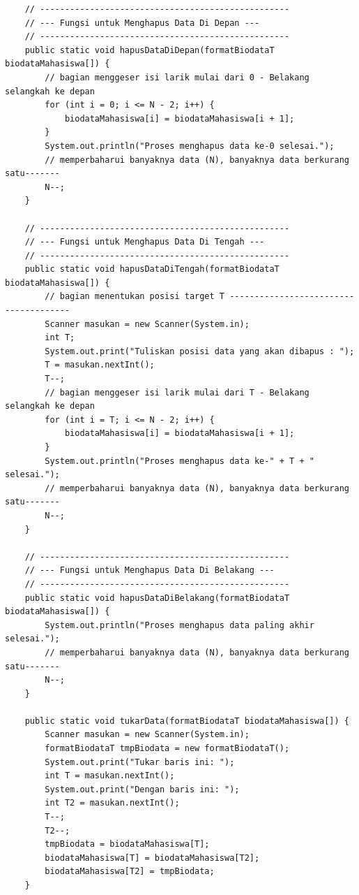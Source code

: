\documentclass[a4paper,12pt]{article}
\begin{document}
\begin{lstlisting}
    // --------------------------------------------------
    // --- Fungsi untuk Menghapus Data Di Depan ---
    // --------------------------------------------------
    public static void hapusDataDiDepan(formatBiodataT biodataMahasiswa[]) {
        // bagian menggeser isi larik mulai dari 0 - Belakang selangkah ke depan
        for (int i = 0; i <= N - 2; i++) {
            biodataMahasiswa[i] = biodataMahasiswa[i + 1];
        }
        System.out.println("Proses menghapus data ke-0 selesai.");
        // memperbaharui banyaknya data (N), banyaknya data berkurang satu-------
        N--;
    }

    // --------------------------------------------------
    // --- Fungsi untuk Menghapus Data Di Tengah ---
    // --------------------------------------------------
    public static void hapusDataDiTengah(formatBiodataT biodataMahasiswa[]) {
        // bagian menentukan posisi target T --------------------------------------
        Scanner masukan = new Scanner(System.in);
        int T;
        System.out.print("Tuliskan posisi data yang akan dibapus : ");
        T = masukan.nextInt();
        T--;
        // bagian menggeser isi larik mulai dari T - Belakang selangkah ke depan
        for (int i = T; i <= N - 2; i++) {
            biodataMahasiswa[i] = biodataMahasiswa[i + 1];
        }
        System.out.println("Proses menghapus data ke-" + T + " selesai.");
        // memperbaharui banyaknya data (N), banyaknya data berkurang satu-------
        N--;
    }

    // --------------------------------------------------
    // --- Fungsi untuk Menghapus Data Di Belakang ---
    // --------------------------------------------------
    public static void hapusDataDiBelakang(formatBiodataT biodataMahasiswa[]) {
        System.out.println("Proses menghapus data paling akhir selesai.");
        // memperbaharui banyaknya data (N), banyaknya data berkurang satu-------
        N--;
    }

    public static void tukarData(formatBiodataT biodataMahasiswa[]) {
        Scanner masukan = new Scanner(System.in);
        formatBiodataT tmpBiodata = new formatBiodataT();
        System.out.print("Tukar baris ini: ");
        int T = masukan.nextInt();
        System.out.print("Dengan baris ini: ");
        int T2 = masukan.nextInt();
        T--;
        T2--;
        tmpBiodata = biodataMahasiswa[T];
        biodataMahasiswa[T] = biodataMahasiswa[T2];
        biodataMahasiswa[T2] = tmpBiodata;
    }


\end{lstlisting}
\end{document}

